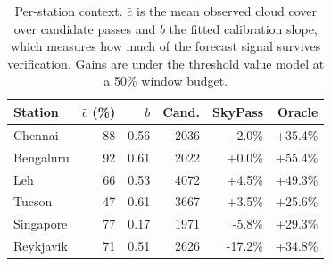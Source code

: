 \begin{table}[t]
\caption{Per-station context. $\bar c$ is the mean observed cloud cover over candidate passes and $b$ the fitted calibration slope, which measures how much of the forecast signal survives verification. Gains are under the threshold value model at a 50\% window budget.}
\label{tab:persite}
\centering
\begin{tabular}{lrrrrr}
\toprule
Station & $\bar c$ (\%) & $b$ & Cand. & SkyPass & Oracle \\
\midrule
Chennai & 88 & 0.56 & 2036 & -2.0\% & +35.4\% \\
Bengaluru & 92 & 0.61 & 2022 & +0.0\% & +55.4\% \\
Leh & 66 & 0.53 & 4072 & +4.5\% & +49.3\% \\
Tucson & 47 & 0.61 & 3667 & +3.5\% & +25.6\% \\
Singapore & 77 & 0.17 & 1971 & -5.8\% & +29.3\% \\
Reykjavik & 71 & 0.51 & 2626 & -17.2\% & +34.8\% \\
\bottomrule
\end{tabular}
\end{table}
